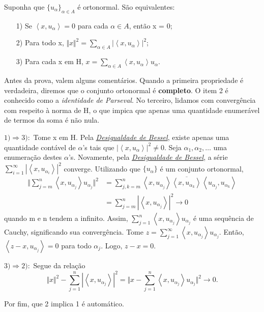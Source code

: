 \documentclass[measure_theory.tex]{subfiles}
\begin{document}
\begin{prop*}
	Suponha que \(\{u_{\alpha }\}_{\alpha \in A}\) é ortonormal. São equivalentes:
	\begin{itemize}
		\item[1)] Se \(\left< x, u_{\alpha } \right> = 0\) para cada \(\alpha \in A\), então x = 0;
		\item[2)] Para todo x, \(\Vert x \Vert^{2} = \sum\limits_{\alpha \in A}^{}|\left< x, u_{\alpha } \right>|^{2}\);
		\item[3)] Para cada x em H, \(x = \sum\limits_{\alpha \in A}^{}\left< x, u_{\alpha } \right>u_{\alpha }\).
	\end{itemize}
\end{prop*}
Antes da prova, valem alguns comentários. Quando a primeira propriedade é verdadeira, diremos que o conjunto ortonormal é \textbf{completo}. O item 2 é conhecido como a \textit{identidade de Parseval}.
No terceiro, lidamos com convergência com respeito à norma de H, o que impica que apenas uma quantidade enumerável de termos da soma é não nula.
\begin{proof*}
	\(1) \Rightarrow 3): \) Tome x em H. Pela \hyperlink{bessel_inequality}{\textit{Desigualdade de Bessel}}, existe apenas uma quantidade contável de \(\alpha \)'s tais que \(|\left< x, u_{\alpha } \right>|^{2}\neq 0\). Seja
	\(\alpha_1, \alpha _2, \dotsc \) uma enumeração destes \(\alpha \)'s. Novamente, pela \hyperlink{bessel_inequality}{\textit{Desigualdade de Bessel}}, a série \(\sum\limits_{i=1}^{\infty}|\left< x, u_{\alpha_{i}} \right>|^{2}\) converge. Utilizando que \(\{u_{\alpha }\}\) é um conjunto ortonormal,
	\begin{align*}
		\biggl\Vert \sum\limits_{j=m}^{n}\left< x, u_{\alpha_{j}} \right>u_{\alpha_{j}}\biggr\Vert^{2} & = \sum\limits_{j, k = m}^{n}\left< x, u_{\alpha_{j}} \right>\overline{\left< x, u_{\alpha_{k}} \right>}\left< u_{\alpha_{j}}, u_{\alpha_{k}} \right> \\
		                                                                                               & = \sum\limits_{j=m}^{n}|\left< x, u_{\alpha_{j}} \right>|^{2}\to 0
	\end{align*}
	quando m e n tendem a infinito. Assim, \(\sum\limits_{j=1}^{n}\left< x, u_{\alpha_{j}} \right>u_{\alpha_{j}}\) é uma sequência de Cauchy, significando sua convergência. Tome \(z = \sum\limits_{j=1}^{\infty}\left< x, u_{\alpha_{j}} \right>u_{\alpha_{j}}.\) Então,
	\(\left< z-x, u_{\alpha_{j}} \right> = 0\) para todo \(\alpha_{j}\). Logo, \(z-x = 0.\)

	\(3)\Rightarrow 2):\) Segue da relação
	\[
		\Vert x \Vert^{2} - \sum\limits_{j=1}^{n}|\left< x, u_{\alpha_{j}} \right>|^{2} = \biggl\Vert x - \sum\limits_{j=1}^{n}\left< x, u_{\alpha_{j}} \right>u_{\alpha_{j}}\biggr\Vert^{2}\to 0.
	\]

	Por fim, que 2 implica 1 é automático. \qedsymbol
\end{proof*}
\end{document}
